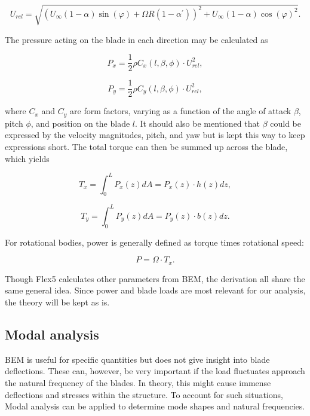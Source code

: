 \begin{equation}
    U_{rel} = \sqrt{\left(U_{\infty}(1-\alpha) \sin (\varphi)+\Omega R \left(1-\alpha^\prime\right)\right)^2+U_{\infty}(1-\alpha) \cos (\varphi)^2}.
\end{equation}

The pressure acting on the blade in each direction may be calculated as

\begin{equation}
    P_{x} = \frac{1}{2}\rho C_x(l,\beta,\phi) \cdot U_{rel}^2,
\end{equation}

\begin{equation}
    P_{y} = \frac{1}{2}\rho C_y(l,\beta,\phi) \cdot U_{rel}^2,
\end{equation}

where $C_x$ and $C_y$ are form factors, varying as a function of the angle of attack $\beta$, pitch $\phi$, and position on the blade $l$. It should also be mentioned that $\beta$ could be expressed by the velocity magnitudes, pitch, and yaw but is kept this way to keep expressions short. The total torque can then be summed up across the blade, which yields

\begin{equation}
    T_x=\int_0^LP_x(z) dA = P_x(z) \cdot h(z) dz,
\end{equation}

\begin{equation}
    T_y=\int_0^LP_y(z) dA = P_y(z) \cdot b(z) dz.
\end{equation}

For rotational bodies, power is generally defined as torque times rotational speed:

\begin{equation}
    \label{powerequation}
    P=\Omega \cdot T_x.
\end{equation}

Though Flex5 calculates other parameters from BEM, the derivation all share the same general idea. Since power and blade loads are most relevant for our analysis, the theory will be kept as is.

\subsection{Modal analysis}

BEM is useful for specific quantities but does not give insight into blade deflections. These can, however, be very important if the load fluctuates approach the natural frequency of the blades. In theory, this might cause immense deflections and stresses within the structure. To account for such situations, Modal analysis \cite{modal} can be applied to determine mode shapes and natural frequencies.

